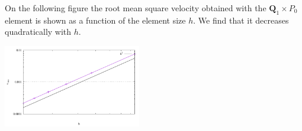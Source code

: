 On the following figure the root mean square velocity obtained with the 
${\bm Q}_1\times P_0$ element is shown as a function of 
the element size $h$. We find that it decreases quadratically with $h$. 
\begin{center}
\includegraphics[width=6cm]{python_codes/fieldstone_42/results/vrms.pdf}
\end{center}


